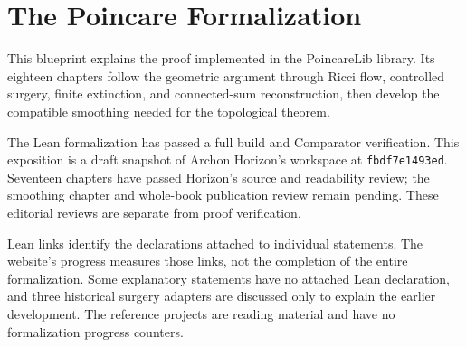 

\chapter*{The Poincare Formalization}

This blueprint explains the proof implemented in the PoincareLib library.
Its eighteen chapters follow the geometric argument through Ricci flow,
controlled surgery, finite extinction, and connected-sum reconstruction,
then develop the compatible smoothing needed for the topological theorem.

The Lean formalization has passed a full build and Comparator verification.
This exposition is a draft snapshot of Archon Horizon's workspace at
\texttt{fbdf7e1493ed}. Seventeen chapters have passed Horizon's source and
readability review; the smoothing chapter and whole-book publication review
remain pending. These editorial reviews are separate from proof verification.

Lean links identify the declarations attached to individual statements.
The website's progress measures those links, not the completion of the
entire formalization. Some explanatory statements have no attached Lean
declaration, and three historical surgery adapters are discussed only to
explain the earlier development. The reference projects are reading material
and have no formalization progress counters.






















